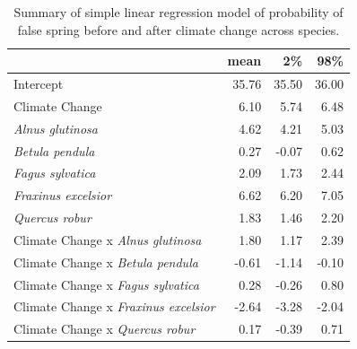 \documentclass{article}\usepackage[]{graphicx}\usepackage[]{color}
\begin{document}
\begin{table}[H]
\centering
\caption{Summary of simple linear regression model of probability of false spring before and after climate change across species.} 
\label{tab:simpfs}
\begin{tabular}{lrrr}
  \hline
 & mean & 2\% & 98\% \\ 
  \hline
Intercept & 35.76 & 35.50 & 36.00 \\ 
  Climate Change & 6.10 & 5.74 & 6.48 \\ 
  \textit{Alnus glutinosa} & 4.62 & 4.21 & 5.03 \\ 
  \textit{Betula pendula} & 0.27 & -0.07 & 0.62 \\ 
  \textit{Fagus sylvatica} & 2.09 & 1.73 & 2.44 \\ 
  \textit{Fraxinus excelsior} & 6.62 & 6.20 & 7.05 \\ 
  \textit{Quercus robur} & 1.83 & 1.46 & 2.20 \\ 
  Climate Change x \textit{Alnus glutinosa} & 1.80 & 1.17 & 2.39 \\ 
  Climate Change x \textit{Betula pendula} & -0.61 & -1.14 & -0.10 \\ 
  Climate Change x \textit{Fagus sylvatica} & 0.28 & -0.26 & 0.80 \\ 
  Climate Change x \textit{Fraxinus excelsior} & -2.64 & -3.28 & -2.04 \\ 
  Climate Change x \textit{Quercus robur} & 0.17 & -0.39 & 0.71 \\ 
   \hline
\end{tabular}
\end{table}
\end{document}
